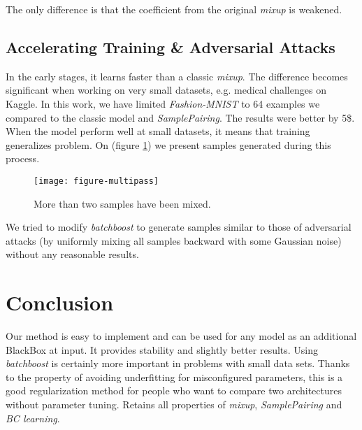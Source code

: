 \documentclass{article}
\begin{document}
The only difference is that the  coefficient from the original
\emph{mixup} is weakened.

\subsection{Accelerating Training \& Adversarial Attacks}
\label{sec:attacks}

In the early stages, it learns faster than a classic \emph{mixup}.
The difference becomes significant when working on very small datasets, e.g.
medical challenges on Kaggle. In this work, we have limited \emph{Fashion-MNIST}
to 64 examples we compared to the classic model and \emph{SamplePairing}. The results were better by 5\$.
When the model perform well at small datasets, it means that training
generalizes problem. On (figure \ref{fig:multipass}) we present samples
generated during this process.

\begin{figure}[H]
  \centering
  \texttt{[image: figure-multipass]}
  \caption{More than two samples have been mixed.}
  \label{fig:multipass}
\end{figure}

We tried to modify \emph{batchboost} to generate samples similar to those of
adversarial attacks (by uniformly mixing all samples backward with some Gaussian
noise) without any reasonable results.

\section{Conclusion}
\label{sec:conclusion}

Our method is easy to implement and can be used for any
model as an additional BlackBox at input.
It provides stability and slightly better results.
Using \emph{batchboost} is certainly more important in problems with small data sets.
Thanks to the property of avoiding underfitting for misconfigured parameters,
this is a good regularization method for people who want to compare two
architectures without parameter tuning.
Retains all properties of \emph{mixup}, \emph{SamplePairing} and \emph{BC learning}.



\end{document}
